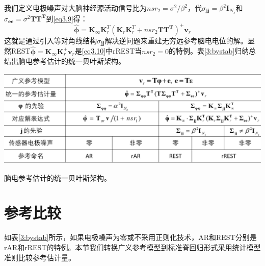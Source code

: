 我们定义电极噪声对大脑神经源活动信号比为$nsr_{2}=\sigma^{2}/\beta^{2}$，代$\sigma_{\mathbf{jj}}=\beta^{2}\mathbf{I}_{N_{s}}$和$\sigma_{\mathbf{ee}}=\sigma^{2}\mathbf{TT^{T}}$到\eqref{eq3.9}得：
\begin{equation}\label{eq3.10}
\hat{\mathbf{\phi}}=\mathbf{K}_{\infty}\mathbf{K}_{r}^{T}(\mathbf{K}_{r}\mathbf{K}_{r}^{T}+nsr_{2}\mathbf{TT^{T}})^{+}\mathbf{v}_{r}
\end{equation}
这就是通过引入等对角线结构$\sigma_{\mathbf{jj}}$解决逆问题来重建无穷远参考脑电电位的解。显然REST$\hat{\mathbf{\phi}}=\mathbf{K}_{\infty}\mathbf{K}_{r}^{+}\mathbf{v}_{r}$是\eqref{eq3.10}中rREST当$nsr_{2}=0$的特例。表\ref{3:bystab}归纳总结出脑电参考估计的统一贝叶斯架构。
\begin{table}[!h]
\includegraphics[width=\linewidth]{pic/Frontier/bayesiantab.png}
\caption{脑电参考估计的统一贝叶斯架构。}
\label{3:bystab}
\end{table}

\section{参考比较}
如表\ref{3:bystab}所示，如果电极噪声为零或不采用正则化技术，AR和REST分别是rAR和rREST的特例。本节我们转换广义参考模型到标准脊回归形式采用统计模型准则比较参考估计量。
